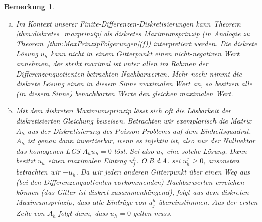 \documentclass[
]{mycourse}
\theoremstyle{mythm}
\newtheorem{bemerkung}[theorem]{Bemerkung}
\theoremstyle{break}
\begin{document}
\begin{bemerkung}
\begin{enumerate}[(a)]
\item
Im Kontext unserer Finite-Differenzen-Diskretisierungen kann Theorem \ref{thm:diskretes_maxprinzip}
als \emph{diskretes Maximumsprinzip} (in Analogie zu Theorem~\ref{thm:MaxPrinzipFolgerungen}(f)) interpretiert werden.
Die diskrete Lösung $u_h$ kann nicht in einem Gitterpunkt einen nicht-negativen Wert annehmen, der strikt maximal ist unter
allen im Rahmen der Differenzenquotienten betrachten Nachbarwerten. Mehr noch: nimmt die diskrete Lösung
einen in diesem Sinne maximalen Wert an, so besitzen alle (in diesem Sinne) benachbarten Werte den gleichen maximalen Wert.
\item Mit dem diskreten Maximumsprinzip lässt sich oft die Lösbarkeit der diskretisierten Gleichung beweisen. Betrachten wir exemplarisch die Matrix
$A_h$ aus der Diskretisierung des Poisson-Problems auf dem Einheitsquadrat. $A_h$ ist genau dann invertierbar, wenn es injektiv ist,
also nur der Nullvektor das homogenen LGS $A_h u_h=0$ löst. Sei also $u_h$ eine solche Lösung. Dann besitzt $u_h$ einen maximalen Eintrag $u^h_j$.
O.B.d.A. sei $u_h^j\geq 0$, ansonsten betrachten wir $-u_h$. 
Da wir jeden anderen Gitterpunkt über einen Weg aus (bei den Differenzenquotienten vorkommenden) Nachbarwerten erreichen können 
(das Gitter ist \emph{diskret zusammenhängend}), folgt aus dem diskreten Maximumsprinzip, dass alle Einträge von 
$u^h_j$ übereinstimmen. Aus der ersten Zeile von $A_h$ folgt dann, dass $u_h=0$ gelten muss.
\end{enumerate}
\end{bemerkung}
\end{document}
